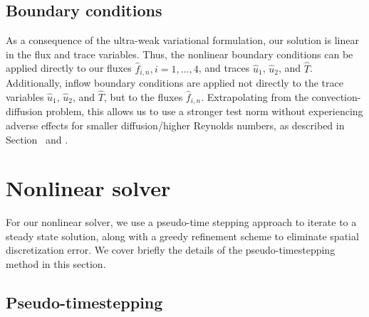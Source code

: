 \subsection{Boundary conditions}

As a consequence of the ultra-weak variational formulation, our solution is linear in the flux and trace variables. Thus, the nonlinear boundary conditions can be applied directly to our fluxes $\widehat{f}_{i,n}, i = 1,\ldots,4$, and traces $\widehat{u}_1$, $\widehat{u}_2$, and $\widehat{T}$. Additionally, inflow boundary conditions are applied not directly to the trace variables $\widehat{u}_1$, $\widehat{u}_2$, and $\widehat{T}$, but to the fluxes $\widehat{f}_{i,n}$. Extrapolating from the convection-diffusion problem, this allows us to use a stronger test norm without experiencing adverse effects for smaller diffusion/higher Reynolds numbers, as described in Section~ and \cite{DPGrobustness,DPGrobustness2}.

\section{Nonlinear solver}

For our nonlinear solver, we use a pseudo-time stepping approach to iterate to a steady state solution, along with a greedy refinement scheme to eliminate spatial discretization error.  We cover briefly the details of the pseudo-timestepping method in this section.  

\subsection{Pseudo-timestepping}


